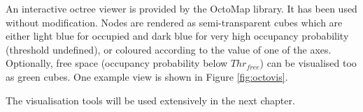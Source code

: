 An interactive octree viewer is provided by the OctoMap library. It has been used without modification. Nodes are rendered as semi-transparent cubes which are either light blue for occupied and dark blue for very high occupancy probability (threshold undefined), or coloured according to the value of one of the axes. Optionally, free space (occupancy probability below $Thr_{free}$) can be visualised too as green cubes. One example view is shown in Figure \ref{fig:octovis}.

The visualisation tools will be used extensively in the next chapter.

